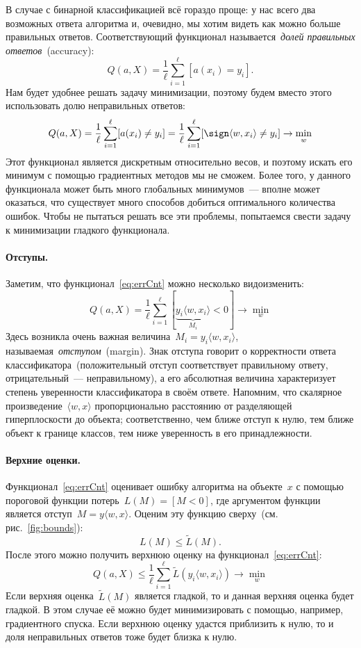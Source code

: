 \documentclass[12pt,fleqn]{article}
\begin{document}
В случае с бинарной классификацией всё гораздо проще: у нас всего два возможных ответа алгоритма и,
очевидно, мы хотим видеть как можно больше правильных ответов.
Соответствующий функционал называется~\emph{долей правильных ответов}~(accuracy):
\[
    Q(a, X)
    =
    \frac{1}{\ell}
    \sum_{i = 1}^{\ell}
        [a(x_i) = y_i].
\]
Нам будет удобнее решать задачу минимизации, поэтому будем вместо этого использовать долю неправильных ответов:
\begin{equation}
\label{eq:errCnt}
    Q(a, X)
    =
    \frac{1}{\ell}
    \sum_{i = 1}^{\ell}
        [a(x_i) \neq y_i]
    =
    \frac{1}{\ell}
    \sum_{i = 1}^{\ell}
        [\sign \langle w, x_i \rangle \neq y_i]
    \to
    \min_w
\end{equation}
Этот функционал является дискретным относительно весов, и поэтому искать его минимум
с помощью градиентных методов мы не сможем.
Более того, у данного функционала может быть много глобальных минимумов~---
вполне может оказаться, что существует много способов добиться оптимального количества ошибок.
Чтобы не пытаться решать все эти проблемы, попытаемся свести задачу к минимизации гладкого функционала.

\paragraph{Отступы.}
Заметим, что функционал~\eqref{eq:errCnt} можно несколько видоизменить:
\[
    Q(a, X)
    =
    \frac{1}{\ell}
    \sum_{i = 1}^{\ell}
        [\underbrace{y_i \langle w, x_i \rangle}_{M_i} < 0]
    \to
    \min_w
\]
Здесь возникла очень важная величина~$M_i = y_i \langle w, x_i \rangle$,
называемая~\emph{отступом}~(margin).
Знак отступа говорит о корректности ответа классификатора~(положительный отступ соответствует
правильному ответу, отрицательный~--- неправильному), а его абсолютная величина характеризует
степень уверенности классификатора в своём ответе.
Напомним, что скалярное произведение~$\langle w, x \rangle$ пропорционально расстоянию
от разделяющей гиперплоскости до объекта;
соответственно, чем ближе отступ к нулю, тем ближе объект к границе классов,
тем ниже уверенность в его принадлежности.

\paragraph{Верхние оценки.}
Функционал~\eqref{eq:errCnt} оценивает ошибку алгоритма на объекте~$x$
с помощью пороговой функции потерь~$L(M) = [M < 0]$,
где аргументом функции является отступ~$M = y \langle w, x \rangle$.
Оценим эту функцию сверху~(см. рис.~\ref{fig:bounds}):
\[
    L(M) \leq \tilde L(M).
\]
После этого можно получить верхнюю оценку на функционал~\eqref{eq:errCnt}:
\[
    Q(a, X)
    \leq
    \frac{1}{\ell}
    \sum_{i = 1}^{\ell}
        \tilde L(y_i \langle w, x_i \rangle)
    \to
    \min_w
\]
Если верхняя оценка~$\tilde L(M)$ является гладкой, то и данная верхняя оценка будет гладкой.
В этом случае её можно будет минимизировать с помощью, например, градиентного спуска.
Если верхнюю оценку удастся приблизить к нулю, то и доля неправильных ответов тоже будет близка к нулю.
\end{document}
